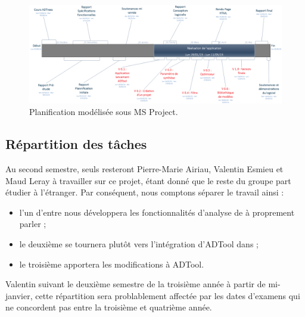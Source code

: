 		\begin{landscape}
			\begin{figure}
				\centering
				\includegraphics[height=0.60\textwidth]{figure/planification.png}
				\caption{Planification modélisée sous MS Project.}
				\label{fig:planif}
			\end{figure}
		\end{landscape}

	\subsection{Répartition des tâches}
		Au second semestre, seuls resteront Pierre-Marie {\sc Airiau}, Valentin {\sc Esmieu} et Maud {\sc Leray} à travailler sur ce projet, étant donné que le reste du groupe part étudier à l'étranger. Par conséquent, nous comptons séparer le travail ainsi :
		\begin{itemize} 
			\item l'un d'entre nous développera les fonctionnalités d'analyse de \glasir{} à proprement parler ;
			\item le deuxième se tournera plutôt vers l'intégration d'ADTool dans \glasir{} ;
			\item le troisième apportera les modifications à ADTool.
		\end{itemize} 
		Valentin suivant le deuxième semestre de la troisième année à partir de mi-janvier, cette répartition sera problablement affectée par les dates d'examens qui ne concordent pas entre la troisième et quatrième année. %

